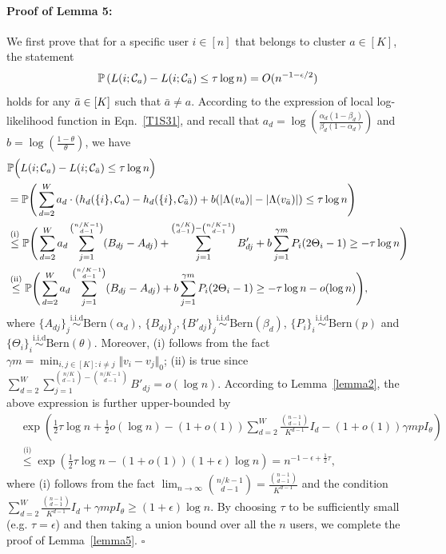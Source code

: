 \documentclass{article}
\newcommand\af{\alpha_d}
\newcommand\bt{\beta_d}
\newcommand\ad{\log \left( \frac{\alpha_d (1-\beta_d)}{\beta_d (1-\alpha_d)} \right)}
\newcommand\bb{\log \left( \frac{1-\theta}{\theta} \right)}
\begin{document}
\paragraph{Proof of Lemma 5:} 
We first prove that for a specific user $i \in [n]$ that belongs to cluster $a \in [K]$, the statement 
    $$
    \mathbb{P} \left( L(i; \mathcal{C}_a) - L(i; \mathcal{C}_{\Bar{a}}) \leq \tau \log n  \right) = O(n^{-1-\epsilon/2})
    $$
holds for any $\Bar{a} \in [K]$ such that $\bar{a}\neq a$. 
According to the expression of local log-likelihood function in Eqn.~\eqref{T1S31}, and recall that $a_d = \ad$ and $b = \bb$, we have
    \begin{equation}
        \begin{aligned}
            &\mathbb{P} \Big( L(i; \mathcal{C}_a) - L(i; \mathcal{C}_{\Bar{a}}) \leq \tau \log n  \Big) \\
            & = \mathbb{P} \Bigg( \sum_{d=2}^W a_d \cdot (h_d(\{i\}, \mathcal{C}_a) - h_d(\{i\}, \mathcal{C}_{\Bar{a}}))  + b ( |\Lambda(v_a)| - |\Lambda(v_{\Bar{a}})| )  \leq \tau \log n \Bigg)\\
            & \overset{\text{(i)}}{\leq} \mathbb{P} \Bigg( \sum_{d=2}^W  a_d \sum_{j=1}^{\binom{n/K-1}{d-1}} (B_{dj} - A_{dj}) + \sum_{j=1}^{\binom{n/K}{d-1}-\binom{n/K-1}{d-1}} B'_{dj}   +  b \sum_{j=1}^{\gamma m} P_i(2\Theta_i - 1) \geq -\tau \log n \Bigg)\\
            & \overset{\text{(ii)}}{\leq} \mathbb{P} \Bigg(  \sum_{d=2}^W a_d \sum_{j=1}^{\binom{n/K-1}{d-1}} (B_{dj} - A_{dj})  + b \sum_{j=1}^{\gamma m} P_i(2\Theta_i - 1) \geq -\tau \log n - o(\log n)  \Bigg),
        \end{aligned}
    \end{equation}
    where $\{A_{dj}\}_j \overset{\text{i.i.d}}{\sim} \text{Bern}(\af)$, $\{B_{dj}\}_j, \{B'_{dj}\}_j \overset{\text{i.i.d}}{\sim} \text{Bern}(\bt)$, $\{P_i\}_i \overset{\text{i.i.d}}{\sim} \text{Bern}(p)$ and $\{\Theta_i\}_i \overset{\text{i.i.d}}{\sim} \text{Bern}(\theta)$. Moreover, (i) follows from the fact $\gamma m = \min_{i,j\in [K]: i \ne j}\Vert v_{i} - v_{j} \Vert_0$; (ii) is true since $\sum_{d=2}^W \sum_{j=1}^{\binom{n/K}{d-1}-\binom{n/K-1}{d-1}} B'_{dj} = o(\log n)$.
        According to Lemma~\ref{lemma2}, the above expression is further upper-bounded by 
    $$
    \begin{aligned}
        & \exp \left( \frac{1}{2} \tau \log n + \frac{1}{2}o(\log n) - (1+o(1))\sum_{d=2}^{W}\frac{\binom{n-1}{d-1}}{K^{d-1}} I_d - (1+o(1)) \gamma m p I_\theta \right) \\
	& \overset{\text{(i)}}{\leq} \exp \left( \frac{1}{2} \tau \log n - (1+o(1)) (1+\epsilon) \log n \right) = n^{-1 - \epsilon + \frac{1}{2} \tau},
    \end{aligned}
    $$
    where (i) follows from the fact $\lim_{n\rightarrow \infty} \binom{n/k-1}{d-1} = \frac{\binom{n-1}{d-1}}{K^{d-1}}$ and the condition $\sum_{d=2}^W \frac{\binom{n-1}{d-1}}{K^{d-1}} I_d + \gamma m p I_{\theta} \geq (1+\epsilon) \log n$. By choosing $\tau$ to be sufficiently small (e.g. $\tau = \epsilon$) and then taking a union bound over all the $n$ users, we complete the proof of Lemma~\ref{lemma5}.
\hfill $\square$\par
\end{document}
